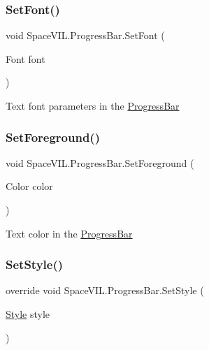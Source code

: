 \subsubsection{\texorpdfstring{Set\+Font()}{SetFont()}}
{\footnotesize\ttfamily void Space\+V\+I\+L.\+Progress\+Bar.\+Set\+Font (\begin{DoxyParamCaption}\item[{Font}]{font }\end{DoxyParamCaption})}



Text font parameters in the \mbox{\hyperlink{class_space_v_i_l_1_1_progress_bar}{Progress\+Bar}} 

\mbox{\label{class_space_v_i_l_1_1_progress_bar_a0f02716ed6e2bd89e2dcf9ca6c575b84}} 
\subsubsection{\texorpdfstring{Set\+Foreground()}{SetForeground()}}
{\footnotesize\ttfamily void Space\+V\+I\+L.\+Progress\+Bar.\+Set\+Foreground (\begin{DoxyParamCaption}\item[{Color}]{color }\end{DoxyParamCaption})}



Text color in the \mbox{\hyperlink{class_space_v_i_l_1_1_progress_bar}{Progress\+Bar}} 

\mbox{\label{class_space_v_i_l_1_1_progress_bar_a7dc05324af7a604cef781aab687b17cc}} 
\subsubsection{\texorpdfstring{Set\+Style()}{SetStyle()}}
{\footnotesize\ttfamily override void Space\+V\+I\+L.\+Progress\+Bar.\+Set\+Style (\begin{DoxyParamCaption}\item[{\mbox{\hyperlink{class_space_v_i_l_1_1_decorations_1_1_style}{Style}}}]{style }\end{DoxyParamCaption})\hspace{0.3cm}{\ttfamily [virtual]}}



